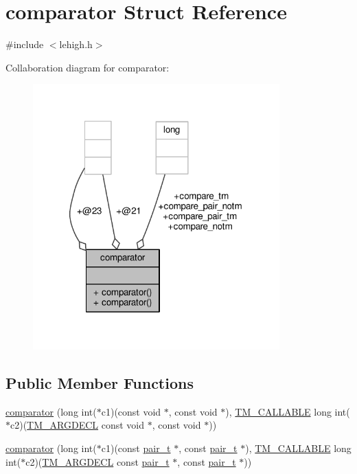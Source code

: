 \hypertarget{structcomparator}{\section{comparator Struct Reference}
\label{structcomparator}
}


{\ttfamily \#include $<$lehigh.\-h$>$}



Collaboration diagram for comparator\-:
\nopagebreak
\begin{figure}[H]
\begin{center}
\leavevmode
\includegraphics[width=269pt]{structcomparator__coll__graph}
\end{center}
\end{figure}
\subsection*{Public Member Functions}
\begin{DoxyCompactItemize}
\item 
\hyperlink{structcomparator_a2a0d7d7bbb180cfb5d45f3dbe68e5d4d}{comparator} (long int($\ast$c1)(const void $\ast$, const void $\ast$), \hyperlink{tm_8h_adf0341d9b0d169f1aba20257caed702e}{T\-M\-\_\-\-C\-A\-L\-L\-A\-B\-L\-E} long int($\ast$c2)(\hyperlink{tm_8h_ae33cc3e793f29d38bc95aadf88d1b6f8}{T\-M\-\_\-\-A\-R\-G\-D\-E\-C\-L} const void $\ast$, const void $\ast$))
\item 
\hyperlink{structcomparator_a4ed4fd30220f5f4638052c79b53fd14c}{comparator} (long int($\ast$c1)(const \hyperlink{pair_8h_a22a04bbebcea6eb94a8adfaf49e4c0a6}{pair\-\_\-t} $\ast$, const \hyperlink{pair_8h_a22a04bbebcea6eb94a8adfaf49e4c0a6}{pair\-\_\-t} $\ast$), \hyperlink{tm_8h_adf0341d9b0d169f1aba20257caed702e}{T\-M\-\_\-\-C\-A\-L\-L\-A\-B\-L\-E} long int($\ast$c2)(\hyperlink{tm_8h_ae33cc3e793f29d38bc95aadf88d1b6f8}{T\-M\-\_\-\-A\-R\-G\-D\-E\-C\-L} const \hyperlink{pair_8h_a22a04bbebcea6eb94a8adfaf49e4c0a6}{pair\-\_\-t} $\ast$, const \hyperlink{pair_8h_a22a04bbebcea6eb94a8adfaf49e4c0a6}{pair\-\_\-t} $\ast$))
\end{DoxyCompactItemize}
